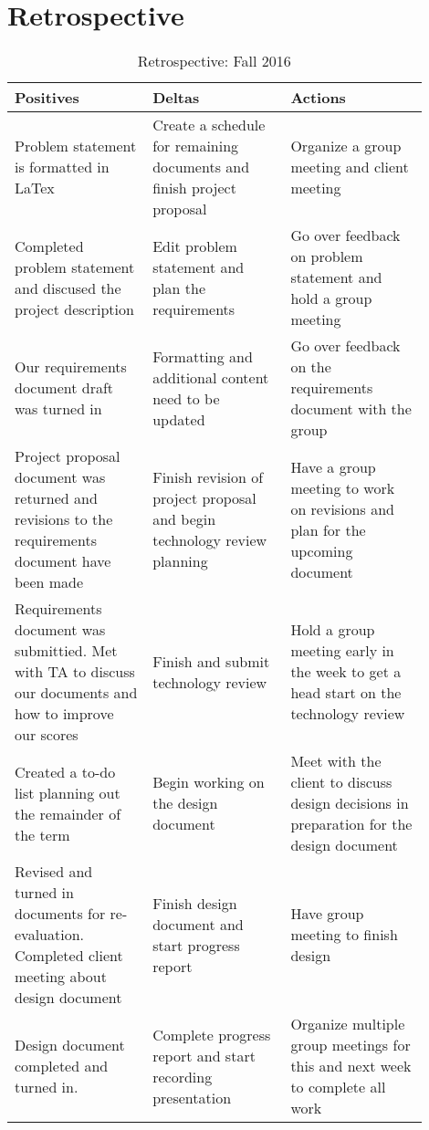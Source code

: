 \documentclass[letterpaper,10pt,titlepage,journal,compsoc,draftclsnofoot,onecolumn]{IEEEtran}
\begin{document}
\section{Retrospective}

\begin{table}[H]
			\caption{Retrospective: Fall 2016}
			\begin{center}
				\begin{tabular}{| p{0.3\linewidth} | p{0.3\linewidth} | p{0.3\linewidth} | }
					\hline
					 \textbf{Positives} & \textbf{Deltas} & \textbf{Actions} \\ [0.5ex]
					\hline
					Problem statement is formatted in LaTex  & Create a schedule for remaining documents and finish project proposal & Organize a group meeting and client meeting  \\
					\hline
					 Completed problem statement and discused the project description & Edit problem statement and plan the requirements & Go over feedback on problem statement and hold a group meeting \\
					\hline
					 Our requirements document draft was turned in & Formatting and additional content need to be updated & Go over feedback on the requirements document with the group \\
					\hline
					Project proposal document was returned and revisions to the requirements document have been made & Finish revision of project proposal and begin technology review planning & Have a group meeting to work on revisions and plan for the upcoming document\\
					\hline
					Requirements document was submittied. Met with TA to discuss our documents and how to improve our scores & Finish and submit technology review & Hold a group meeting early in the week to get a head start on the technology review\\
					\hline
					Created a to-do list planning out the remainder of the term & Begin working on the design document & Meet with the client to discuss design decisions in preparation for the design document  \\
					\hline
					Revised and turned in documents for re-evaluation. Completed client meeting about design document & Finish design document and start progress report & Have group meeting to finish design \\
					\hline
					 Design document completed and turned in. & Complete progress report and start recording presentation & Organize multiple group meetings for this and next week to complete all work \\
					\hline

				\end{tabular}
			\end{center}
			\end{table}
\end{document}

